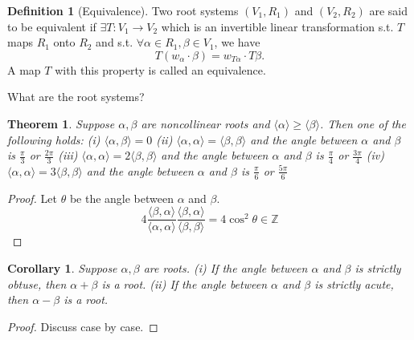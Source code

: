 \documentclass{article}
\newtheorem{theorem}{Theorem}[section]
\newtheorem{corollary}{Corollary}[theorem]
\theoremstyle{definition}
\newtheorem{definition}{Definition}[section]
\begin{document}
\begin{definition}[Equivalence]
    Two root systems $(V_1,R_1)$ and $(V_2,R_2)$ are said to be equivalent if $\exists T:V_1\to V_2$ which is an invertible linear transformation
    s.t. $T$ maps $R_1$ onto $R_2$ and s.t. $\forall \alpha\in R_1,\beta\in V_1$, we have 
    \[ T(w_\alpha\cdot \beta)=w_{T\alpha}\cdot T\beta.\] 
    A map $T$ with this property is called an equivalence.
\end{definition}

What are the root systems?
\begin{theorem}\label{4 cases}
    Suppose $\alpha,\beta$ are noncollinear roots and $\langle\alpha\rangle\ge\langle\beta\rangle$. Then one of the following holds:\newline 
    (i) $\langle \alpha,\beta\rangle=0$ \newline 
    (ii) $\langle \alpha,\alpha\rangle=\langle \beta,\beta\rangle$ and the angle between $\alpha$ and $\beta$ is $\frac{\pi}{3}$ or $\frac{2\pi}{3}$\newline 
    (iii) $\langle \alpha,\alpha\rangle=2\langle \beta,\beta\rangle$ and the angle between $\alpha$ and $\beta$ is $\frac{\pi}{4}$ or $\frac{3\pi}{4}$\newline 
    (iv) $\langle \alpha,\alpha\rangle=3\langle \beta,\beta\rangle$ and the angle between $\alpha$ and $\beta$ is $\frac{\pi}{6}$ or $\frac{5\pi}{6}$
\end{theorem}
\begin{proof}
    Let $\theta$ be the angle between $\alpha$ and $\beta$.
    \[4\frac{\langle\beta,\alpha\rangle}{\langle\alpha,\alpha\rangle}\frac{\langle\beta,\alpha\rangle}{\langle\beta,\beta\rangle}=4\cos^2\theta\in \mathbb{Z}\]
\end{proof}
\begin{corollary}\label{a+b}
    Suppose $\alpha,\beta$ are roots. \newline
    (i) If the angle between $\alpha$ and $\beta$ is strictly obtuse, then $\alpha+\beta$ is a root.\newline 
    (ii) If the angle between $\alpha$ and $\beta$ is strictly acute, then $\alpha-\beta$ is a root.
\end{corollary}
\begin{proof}
    Discuss case by case.
\end{proof}
\end{document}
